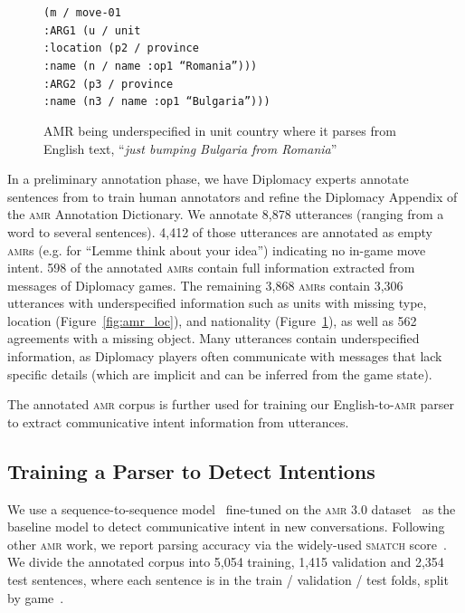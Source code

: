 \documentclass[oneside]{memoir}
\newcommand{\abr}[1]{\textsc{#1}}
\begin{document}
\begin{figure}[h]
    \small{ \texttt{(m / move-01\\
    \hspace*{4 mm}:ARG1 (u / unit\\
    \hspace*{8 mm}:location (p2 / province\\  
    \hspace*{16 mm}:name (n / name :op1 ``Romania'')))\\
    \hspace*{4 mm}:ARG2 (p3 / province\\ 
    \hspace*{8 mm}:name (n3 / name :op1 ``Bulgaria'')))\\}}
    \caption{\label{fig:amr_country}AMR being underspecified in unit country where it parses from English text, ``\textit{just bumping Bulgaria from Romania}''}
\end{figure}
In a preliminary annotation phase, we have Diplomacy experts annotate sentences from \citet{peskov2020takes} to train human annotators and refine the Diplomacy Appendix of the \abr{amr} Annotation Dictionary.
%
We annotate 8,878 utterances
(ranging from a word to several sentences).
%
4,412 of those utterances are annotated as empty \abr{amr}s (e.g. for
``Lemme think about your idea'') indicating no in-game move intent.
%
598 of the annotated \abr{amr}s contain full information
extracted from messages of Diplomacy games. The remaining 3,868 \abr{amr}s
contain 3,306 utterances with underspecified information such as units
with missing type, location (Figure~\ref{fig:amr_loc}), and nationality (Figure~\ref{fig:amr_country}), as well as 562 agreements with a
missing object.
Many utterances contain underspecified information, as Diplomacy players often communicate with messages that lack specific details (which are implicit and can be inferred from the game state).

The annotated \abr{amr} corpus is further used for
training our English-to-\abr{amr} parser to extract communicative intent information from
utterances.

\subsection{Training a Parser to Detect Intentions}
\label{sec:amr_parser}

We use a sequence-to-sequence
model~\citep{amrlib2023}
fine-tuned on the \abr{amr} 3.0 dataset~\citep{LDC2020} as the baseline model to detect
communicative intent in new conversations.
%
Following other \abr{amr} work, we report parsing accuracy via the
widely-used \abr{smatch} score~\citep{cai-knight-2013-smatch}.
% 
We divide the annotated corpus into 5,054 training, 1,415 validation
and 2,354 test sentences, where each sentence is in the train /
validation / test folds, split by game~\citep{peskov2020takes}.
\end{document}
